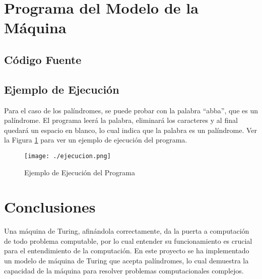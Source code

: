 \section{Programa del Modelo de la M\'aquina}
\subsection{C\'odigo Fuente}

\subsection{Ejemplo de Ejecuci\'on}
Para el caso de los pal\'indromes, se puede probar con la palabra ``abba'', que es un pal\'indrome. El programa leer\'a la palabra, eliminar\'a los caracteres y al final quedar\'a un espacio en blanco, lo cual indica que la palabra es un pal\'indrome. Ver la Figura \ref{fig:ejecucion} para ver un ejemplo de ejecuci\'on del programa.
\begin{figure}[h]
  \label{fig:ejecucion}
  \begin{center}
    \texttt{[image: ./ejecucion.png]}
  \end{center}
  \caption{Ejemplo de Ejecuci\'on del Programa}
\end{figure}
\section{Conclusiones}
Una m\'aquina de Turing, afin\'andola correctamente, da la puerta a computaci\'on de todo problema computable, por lo cual entender su funcionamiento es crucial para el entendimiento de la computaci\'on. En este proyecto se ha implementado un modelo de m\'aquina de Turing que acepta pal\'indromes, lo cual demuestra la capacidad de la m\'aquina para resolver problemas computacionales complejos.
\printbibliography


